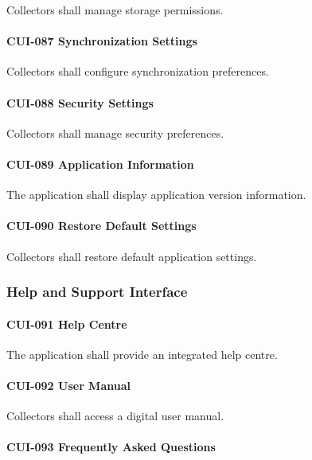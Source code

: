 Collectors shall manage storage permissions.

\paragraph{CUI-087 Synchronization Settings}

Collectors shall configure synchronization preferences.

\paragraph{CUI-088 Security Settings}

Collectors shall manage security preferences.

\paragraph{CUI-089 Application Information}

The application shall display application version information.

\paragraph{CUI-090 Restore Default Settings}

Collectors shall restore default application settings.


\subsubsection*{Help and Support Interface}

\paragraph{CUI-091 Help Centre}

The application shall provide an integrated help centre.

\paragraph{CUI-092 User Manual}

Collectors shall access a digital user manual.

\paragraph{CUI-093 Frequently Asked Questions}


